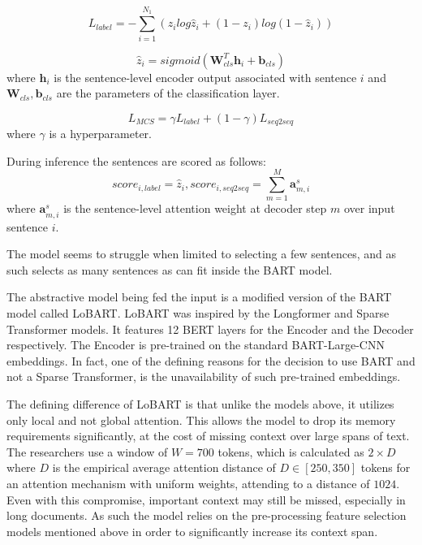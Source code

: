 \documentclass[preprint,review,12pt]{elsarticle}
\begin{document}
\begin{equation}
    L_{label} = - \sum^{N_1}_{i=1}(z_i log\hat{z}_i + (1-z_i) log(1-\hat{z}_i))
\end{equation}

\begin{equation}
    \hat{z}_i = sigmoid(\mathbf{W}^T_{cls} \mathbf{h}_i + \mathbf{b}_{cls}) 
\end{equation}
where $\mathbf{h}_i$ is the sentence-level encoder output associated with sentence $i$ and $\mathbf{W}_{cls}, \mathbf{b}_{cls}$ are the parameters of the classification layer.

\begin{equation}
    L_{MCS} = \gamma L_{label} + (1-\gamma)L_{seq2seq}
\end{equation}
where $\gamma$ is a hyperparameter.

During inference the sentences are scored as follows:
\begin{equation}
    score_{i, label} = \hat{z}_i, score_{i, seq2seq} = \sum^{M}_{m=1} \mathbf{a}^s_{m,i}
\end{equation}
where $\mathbf{a}^s_{m,i}$ is the sentence-level attention weight at decoder step $m$ over input sentence $i$.

The model seems to struggle when limited to selecting a few sentences, and as such selects as many sentences as can fit inside the BART model. 


The abstractive model being fed the input is a modified version of the BART \cite{bart} model called LoBART. LoBART was inspired by the Longformer \cite{longformer} and Sparse Transformer \cite{child} models. It features 12 BERT layers for the Encoder and the Decoder respectively. The Encoder is pre-trained on the standard BART-Large-CNN embeddings. In fact, one of the defining reasons for the decision to use BART and not a Sparse Transformer, is the unavailability of such pre-trained embeddings. 

The defining difference of LoBART is that unlike the models above, it utilizes only local and not global attention. This allows the model to drop its memory requirements significantly, at the cost of missing context over large spans of text. The researchers use a window of $W=700$ tokens, which is calculated as $2 \times D$ where $D$ is the empirical average attention distance of $D \in [250, 350]$ tokens for an attention mechanism with uniform weights, attending to a distance of $1024$. Even with this compromise, important context may still be missed, especially in long documents. As such the model relies on the pre-processing feature selection models mentioned above in order to significantly increase its context span. 
\end{document}
